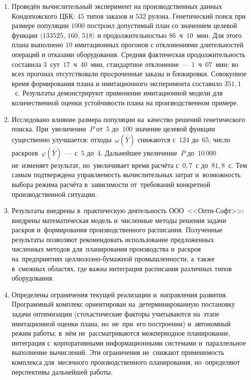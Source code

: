 \begin{enumerate}
  \item Проведён вычислительный эксперимент на производственных данных Кондопожского ЦБК: $45$ типов заказов и $532$ рулона.
  Генетический поиск при размере популяции $1000$ построил допустимый план со значением целевой функции $\langle133525,\,160,\,518\rangle$ и продолжительностью $86$~ч~$10$~мин. Для этого плана выполнено $10$ имитационных прогонов с отклонениями длительностей операций и отказами оборудования. Средняя фактическая продолжительность составила $3$~сут~$17$~ч~$40$~мин, стандартное отклонение~--- $1$~ч~$07$~мин; во всех прогонах отсутствовали просроченные заказы и блокировки. Совокупное время формирования плана и имитационного эксперимента составило $351{,}1$~с.
  Результаты демонстрируют применение имитационной модели для количественной оценки устойчивости плана на производственном примере.

  \item Исследовано влияние размера популяции на~качество решений генетического поиска.
  При~увеличении~$P$ от~$5$ до~$100$ значение целевой функции существенно улучшается: отходы~$\omega(\overline{\overline{Y}})$ снижаются с~$124$ до~$65$, число раскроев~$\varphi(\overline{\overline{Y}})$~--- с~$5$ до~$4$.
  Дальнейшее увеличение~$P$ до~$10\,000$ не~изменяет результат, но~увеличивает время расчёта с~$0{,}7$~с до~$81{,}8$~с.
  Тем самым подтверждена управляемость вычислительных затрат и~возможность выбора режима расчёта в~зависимости от~требований конкретной производственной ситуации.

  \item Результаты внедрены в~практическую деятельность ООО~<<Опти-Софт>>: внедрены математическая модель и~численные методы решения задачи раскроя и~формирования производственного расписания.
  Полученные результаты позволяют рекомендовать использование предложенных численных методов для~планирования производства и~раскроя на~предприятиях целлюлозно-бумажной промышленности, а~также в~смежных областях, где важна интеграция расписания различных типов оборудования.

  \item Определены ограничения текущей реализации и~направления развития.
  Программный комплекс ориентирован на~детерминированную постановку задачи оптимизации (стохастические факторы учитываются на~этапе имитационной оценки плана, но~не~при~его построении) и~автономный режим работы; в~нём не~рассматриваются межпериодное планирование, интеграция с~корпоративными информационными системами и~параллельное выполнение вычислений.
  Эти ограничения не~снижают применимость комплекса для~месячного производственного планирования, но~определяют перспективы дальнейшей работы.
\end{enumerate}

